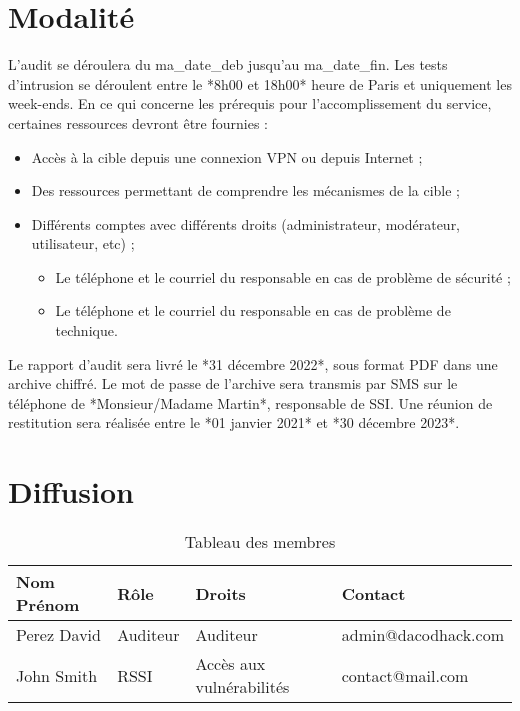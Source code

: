 \documentclass[12pt]{extarticle}
\begin{document}
\section{Modalité}
    L’audit se déroulera du ma_date_deb jusqu’au ma_date_fin. Les tests d’intrusion se déroulent entre le *8h00 et 18h00* heure de Paris et uniquement les week-ends.
    En ce qui concerne les prérequis pour l’accomplissement du service, certaines ressources devront être fournies :
    \begin{itemize}
        \item Accès à la cible depuis  une connexion VPN ou depuis Internet ;
        \item Des ressources permettant de comprendre les mécanismes de la cible ;
        \item Différents comptes avec différents droits (administrateur, modérateur, utilisateur, etc) ;
        \begin{itemize}
            \item Le téléphone et le courriel du responsable en cas de problème de sécurité ;
            \item Le téléphone et le courriel du responsable en cas de problème de technique.
        \end{itemize}
    \end{itemize}
    Le rapport d’audit sera livré le *31 décembre 2022*, sous format PDF dans une archive chiffré. Le mot de passe de l’archive sera transmis par SMS sur le téléphone de *Monsieur/Madame Martin*, responsable de SSI.
    Une réunion de restitution sera réalisée entre le *01 janvier 2021* et  *30 décembre 2023*.
\section{Diffusion}
    \begin{table}[h]
        \centering
        \caption{Tableau des membres}
        \begin{tabular}{|l|l|l|l|}
            \hline
            \textbf{Nom Prénom} & \textbf{Rôle} & \textbf{Droits} & \textbf{Contact} \\
            \hline
            Perez David         & Auditeur      & Auditeur        & admin@dacodhack.com \\
            \hline
            John Smith          & RSSI          & Accès aux vulnérabilités & contact@mail.com \\
            \hline
        \end{tabular}
        \label{tab:membres}
    \end{table}
\end{document}
